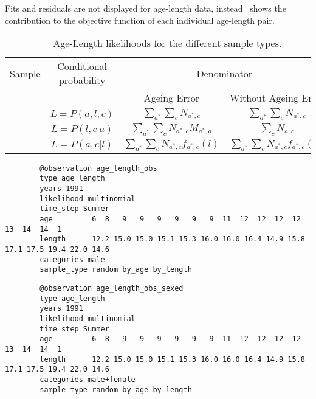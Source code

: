 Fits and residuals are not displayed for age-length data, instead \CNAME\ shows the contribution
to the objective function of each individual age-length pair.

\begin{table}[h!]
	\centering
	\caption{Age-Length likelihoods for the different sample types.}
	\label{tab:agelength:likelihoods}
	\begin{tabular}{|c | c | c | c|} 
		\hline
		Sample & Conditional probability & \multicolumn{2}{c}{Denominator} \\
		\multicolumn{2}{|c|}{} & Ageing Error & Without Ageing Error\\
		\hline\hline
		\subcommand{random} &\(L = P(a,l,c) \) & \(\sum_{a^*}\sum_{c} N_{a^*,c}\) & \(\sum_{a^*}\sum_{c} N_{a^*,c}\) \\ 
		\subcommand{by\_age} & \(L = P(l,c|a) \) & \(\sum_{a^*}\sum_{c} N_{a^*,c}M_{a^*,a}\) & \(\sum_{c} N_{a,c}\) \\
		\subcommand{by\_length} & \(L = P(a,c|l) \) & \(\sum_{a^*}\sum_{c} N_{a^*,c}f_{a^*,c}(l)\) &  \(\sum_{a^*}\sum_{c} N_{a^*,c}f_{a^*,c}(l)\)  \\
		\hline
	\end{tabular}
\end{table}


{\small{\begin{verbatim}
		@observation age_length_obs
		type age_length
		years 1991
		likelihood multinomial
		time_step Summer
		age   		6  8   9   9   9   9   9   9  11  12  12  12  12  13  14  14  1
		length 		12.2 15.0 15.0 15.1 15.3 16.0 16.0 16.4 14.9 15.8 17.1 17.5 19.4 22.0 14.6 
		categories male
		sample_type random by_age by_length
\end{verbatim}}}




{\small{\begin{verbatim}
		@observation age_length_obs_sexed
		type age_length
		years 1991
		likelihood multinomial
		time_step Summer
		age   		6  8   9   9   9   9   9   9  11  12  12  12  12  13  14  14  1
		length 		12.2 15.0 15.0 15.1 15.3 16.0 16.0 16.4 14.9 15.8 17.1 17.5 19.4 22.0 14.6 
		categories male+female
		sample_type random by_age by_length
\end{verbatim}}}
	


\paragraph*{}\label{sec:Observation-ProportionsByCategory}

